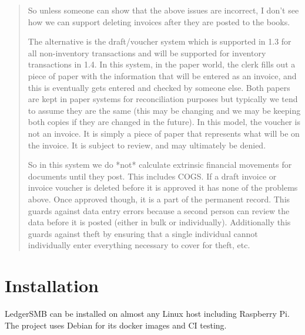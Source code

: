 \begin{quote}
So unless someone can show that the above issues are incorrect, I don't see how we can support deleting invoices after they are posted to the books.

The alternative is the draft/voucher system which is supported in 1.3 for all non-inventory transactions and will be supported for inventory transactions in 1.4.  In this system, in the paper world, the clerk fills out a piece of paper with the information that will be entered as an invoice, and this is eventually gets entered and checked by someone else.  Both papers are kept in paper systems for reconciliation purposes but typically we tend to assume they are the same (this may be changing and we may be keeping both copies if they are changed in the future).  In this model, the voucher is not an invoice.  It is simply a piece of paper that represents what will be on the invoice.  It is subject to review, and may ultimately be denied.

So in this system we do *not* calculate extrinsic financial movements for documents until they post.  This includes COGS.  If a draft invoice or invoice voucher is deleted before it is approved it has none of the problems above.  Once approved though, it is a part of the permanent record.  This guards against data entry errors because a second person can review the data  before it is posted (either in bulk or individually).   Additionally this guards against theft by ensuring that a single individual cannot individually enter everything necessary to cover for theft, etc.
\end{quote}

\chapter{Installation}
\label{app-installation}

LedgerSMB can be installed on almost any Linux host including Raspberry Pi. The project uses Debian for its docker images and \gls{CI} testing.  

